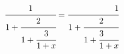 \documentclass[nofonts]{ctexart}
\begin{document}
\[
	\cfrac{1}{1+ \cfrac{2}{%
		1+ \cfrac{3}{1+x}}} = 
	\cfrac[r]{1}{1+ \cfrac{2}{%
		1+ \cfrac[l]{3}{1+x}}}
\]
\end{document}
